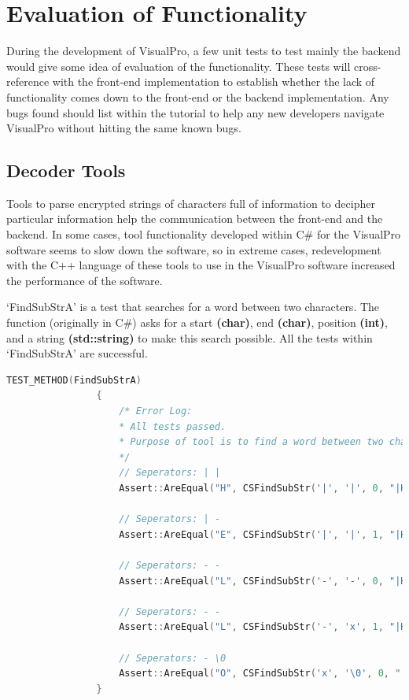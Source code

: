\documentclass[12pt]{report} %
\begin{document}
	\chapter{Evaluation of Functionality}
		During the development of VisualPro, a few unit tests to test mainly the backend would give some idea of evaluation of the functionality. These tests will cross-reference with the front-end implementation to establish whether the lack of functionality comes down to the front-end or the backend implementation. Any bugs found should list within the tutorial to help any new developers navigate VisualPro without hitting the same known bugs.

		\section{Decoder Tools}
			Tools to parse encrypted strings of characters full of information to decipher particular information help the communication between the front-end and the backend. In some cases, tool functionality developed within C\# for the VisualPro software seems to slow down the software, so in extreme cases, redevelopment with the C++ language of these tools to use in the VisualPro software increased the performance of the software.

			`FindSubStrA' is a test that searches for a word between two characters. The function (originally in C\#) asks for a start \textbf{(char)}, end \textbf{(char)}, position \textbf{(int)}, and a string \textbf{(std::string)} to make this search possible. All the tests within `FindSubStrA' are successful.

			\begin{lstlisting}[language=c++]
				TEST_METHOD(FindSubStrA)
				{
					/* Error Log:
					* All tests passed.
					* Purpose of tool is to find a word between two characters.
					*/
					// Seperators: | |
					Assert::AreEqual("H", CSFindSubStr('|', '|', 0, "|H|E-L-LxO").c_str());

					// Seperators: | -
					Assert::AreEqual("E", CSFindSubStr('|', '|', 1, "|H|E|L-LxO").c_str());

					// Seperators: - -
					Assert::AreEqual("L", CSFindSubStr('-', '-', 0, "|H|E-L-LxO").c_str());

					// Seperators: - -
					Assert::AreEqual("L", CSFindSubStr('-', 'x', 1, "|H|E-L-LxO").c_str());

					// Seperators: - \0
					Assert::AreEqual("O", CSFindSubStr('x', '\0', 0, "|H|E-L-LxO").c_str());
				}
			\end{lstlisting}
\end{document}

